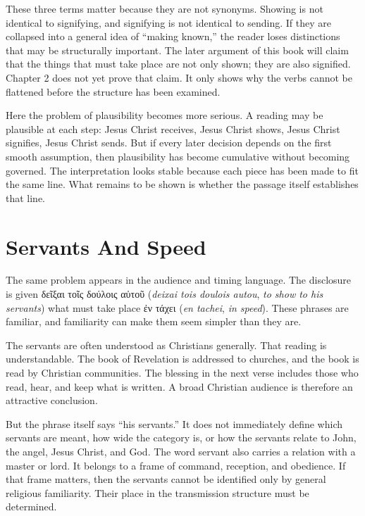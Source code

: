 These three terms matter because they are not synonyms. Showing is not identical to signifying, and signifying is not identical to sending. If they are collapsed into a general idea of ``making known,'' the reader loses distinctions that may be structurally important. The later argument of this book will claim that the things that must take place are not only shown; they are also signified. Chapter 2 does not yet prove that claim. It only shows why the verbs cannot be flattened before the structure has been examined.

Here the problem of plausibility becomes more serious. A reading may be plausible at each step: Jesus Christ receives, Jesus Christ shows, Jesus Christ signifies, Jesus Christ sends. But if every later decision depends on the first smooth assumption, then plausibility has become cumulative without becoming governed. The interpretation looks stable because each piece has been made to fit the same line. What remains to be shown is whether the passage itself establishes that line.

\section{Servants And Speed}

The same problem appears in the audience and timing language. The disclosure is given \textgreek{δεῖξαι τοῖς δούλοις αὐτοῦ} (\textit{deixai tois doulois autou}, \textit{to show to his servants}) what must take place \textgreek{ἐν τάχει} (\textit{en tachei}, \textit{in speed}). These phrases are familiar, and familiarity can make them seem simpler than they are.

The servants are often understood as Christians generally. That reading is understandable. The book of Revelation is addressed to churches, and the book is read by Christian communities. The blessing in the next verse includes those who read, hear, and keep what is written. A broad Christian audience is therefore an attractive conclusion.

But the phrase itself says ``his servants.'' It does not immediately define which servants are meant, how wide the category is, or how the servants relate to John, the angel, Jesus Christ, and God. The word servant also carries a relation with a master or lord. It belongs to a frame of command, reception, and obedience. If that frame matters, then the servants cannot be identified only by general religious familiarity. Their place in the transmission structure must be determined.

